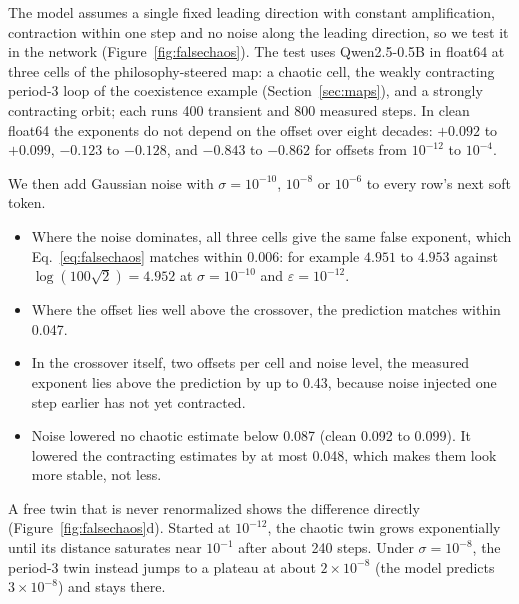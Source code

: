 \documentclass[11pt,letterpaper]{article}
\begin{document}
The model assumes a single fixed leading direction with constant amplification, contraction within one step and no
noise along the leading direction, so we test it in the network
(Figure~\ref{fig:falsechaos}). The test uses Qwen2.5-0.5B in float64 at three cells of the philosophy-steered map: a
chaotic cell, the weakly contracting period-3 loop of the coexistence example (Section~\ref{sec:maps}), and a strongly
contracting orbit; each runs 400 transient and 800 measured steps. In clean float64 the exponents do not depend on the
offset over eight decades: $+0.092$ to $+0.099$, $-0.123$ to $-0.128$, and $-0.843$ to $-0.862$ for offsets from
$10^{-12}$ to $10^{-4}$.

We then add Gaussian noise with $\sigma=10^{-10}$, $10^{-8}$ or $10^{-6}$ to every row's next soft token.
\begin{itemize}
  \item Where the noise dominates, all three cells give the same false exponent, which Eq.~\eqref{eq:falsechaos}
  matches within 0.006: for example $4.951$ to $4.953$ against $\log(100\sqrt2)=4.952$ at $\sigma=10^{-10}$ and
  $\varepsilon=10^{-12}$.
  \item Where the offset lies well above the crossover, the prediction matches within 0.047.
  \item In the crossover itself, two offsets per cell and noise level, the measured exponent lies above the prediction
  by up to 0.43, because noise injected one step earlier has not yet contracted.
  \item Noise lowered no chaotic estimate below 0.087 (clean 0.092 to 0.099). It lowered the contracting estimates by at
  most 0.048, which makes them look more stable, not less.
\end{itemize}
A free twin that is never renormalized shows the difference directly (Figure~\ref{fig:falsechaos}d). Started at
$10^{-12}$, the chaotic twin grows exponentially until its distance saturates near $10^{-1}$ after about 240 steps.
Under $\sigma=10^{-8}$, the period-3 twin instead jumps to a plateau at about $2\times10^{-8}$ (the model predicts
$3\times10^{-8}$) and stays there.
\end{document}
